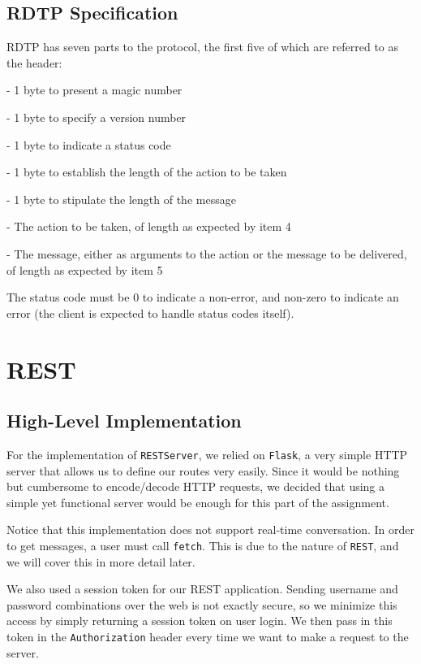 \documentclass[10pt]{article}
\begin{document}
\subsection{RDTP Specification}

RDTP has seven parts to the protocol, the first five of which are referred to as the header:

\medskip

- 1 byte to present a magic number

- 1 byte to specify a version number

- 1 byte to indicate a status code

- 1 byte to establish the length of the action to be taken

- 1 byte to stipulate the length of the message

- The action to be taken, of length as expected by item 4

- The message, either as arguments to the action or the message to be delivered, of length as expected by item 5

\medskip

The status code must be 0 to indicate a non-error, and non-zero to indicate an error (the client is expected to handle status codes itself).

\section{REST}

\subsection{High-Level Implementation}

For the implementation of \verb|RESTServer|, we relied on \verb|Flask|, a very simple HTTP server that allows us
to define our routes very easily. Since it would be nothing but cumbersome to encode/decode HTTP requests, we
decided that using a simple yet functional server would be enough for this part of the assignment.

\medskip

Notice that this implementation does not support real-time conversation. In order to get messages, a user must
call \verb|fetch|. This is due to the nature of \verb|REST|, and we will cover this in more detail later.

\medskip

We also used a session token for our REST application. Sending username and password combinations over the web
is not exactly secure, so we minimize this access by simply returning a session token on user login. We then pass in
this token in the \verb|Authorization| header every time we want to make a request to the server.
\end{document}
